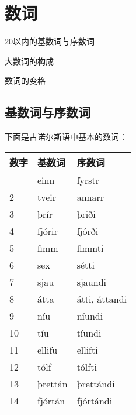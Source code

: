 \chapter{数词}

\begin{introduction}[章节要点]
    \item 20以内的基数词与序数词
    \item 大数词的构成
    \item 数词的变格
\end{introduction}

\section{基数词与序数词}
下面是古诺尔斯语中基本的数词：

\begin{longtable}{lll}
    \toprule
    数字   & 基数词                   & 序数词                                \\
    \midrule
    \endhead
    \bottomrule
    \endfoot
    1    & einn                  & fyrstr                             \\
    2    & tveir                 & annarr                             \\
    3    & þrír                  & þriði                              \\
    4    & fjórir                & fjórði                             \\
    5    & fimm                  & fimmti                             \\
    6    & sex                   & sétti                              \\
    7    & sjau                  & sjaundi                            \\
    8    & átta                  & átti, áttandi                      \\
    9    & níu                   & níundi                             \\
    10   & tíu                   & tíundi                             \\
    11   & ellifu                & ellifti                            \\
    12   & tólf                  & tólfti                             \\
    13   & þrettán               & þrettándi                          \\
    14   & fjórtán               & fjórtándi                          \\

\end{longtable}
